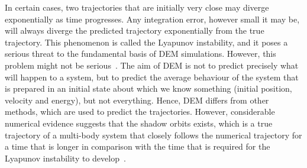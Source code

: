 In certain cases, two trajectories that are initially very close may diverge 
exponentially as time progresses. Any integration error, however small it may 
be, will always diverge the predicted trajectory exponentially from the true 
trajectory. This phenomenon is called the Lyapunov instability, and it poses a 
serious threat to the fundamental basis of DEM simulations. 
However, this problem might not be serious~\citep{Frenkel1996}. The aim of DEM 
is not to predict precisely what will happen to a system, but to predict the 
average behaviour of the system that is prepared in an initial state about 
which we 
know something (initial position, velocity and energy), but not everything. 
Hence, DEM differs from other methods, which are used to predict the 
trajectories. However, considerable numerical evidence suggests that 
the shadow orbits exists, which is a true trajectory of a multi-body system 
that closely follows the numerical trajectory for a time that is longer in 
comparison with the time that is required for the Lyapunov instability to 
develop~\citep{Frenkel1996}.

